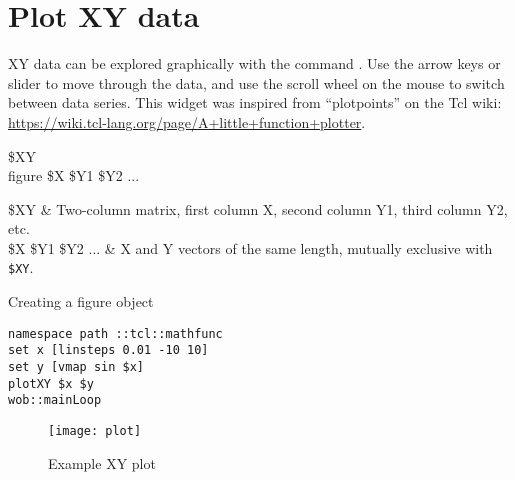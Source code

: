 \section{Plot XY data}
XY data can be explored graphically with the command . Use the arrow keys or slider to move through the data, and use the scroll wheel on the mouse to switch between data series.
This widget was inspired from ``plotpoints'' on the Tcl wiki: \url{https://wiki.tcl-lang.org/page/A+little+function+plotter}.
\begin{syntax}
 \$XY \\
figure \$X \$Y1 \$Y2 ...
\end{syntax}
\begin{args}
\$XY & Two-column matrix, first column X, second column Y1, third column Y2, etc. \\
\$X \$Y1 \$Y2 ... & X and Y vectors of the same length, mutually exclusive with \texttt{\$XY}. 
\end{args}
\begin{example}{Creating a figure object}
\begin{lstlisting}
namespace path ::tcl::mathfunc
set x [linsteps 0.01 -10 10]
set y [vmap sin $x]
plotXY $x $y
wob::mainLoop
\end{lstlisting}
\end{example}
\begin{figure}[!htb]
\centering
\texttt{[image: plot]}
\caption{Example XY plot}
\label{fig:plot}
\end{figure}
